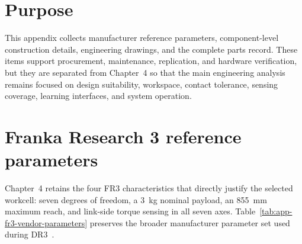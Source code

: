
\label{chap:hardware-records}

\section*{Purpose}

This appendix collects manufacturer reference parameters, component-level construction details, engineering drawings, and the complete parts record. These items support procurement, maintenance, replication, and hardware verification, but they are separated from Chapter~4 so that the main engineering analysis remains focused on design suitability, workspace, contact tolerance, sensing coverage, learning interfaces, and system operation.

\section*{Franka Research 3 reference parameters}

Chapter~4 retains the four FR3 characteristics that directly justify the selected workcell: seven degrees of freedom, a 3~kg nominal payload, an 855~mm maximum reach, and link-side torque sensing in all seven axes. Table~\ref{tab:app-fr3-vendor-parameters} preserves the broader manufacturer parameter set used during DR3~\cite{fr3datasheet,fr3product,frankafci}.

